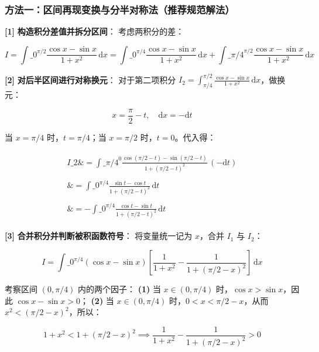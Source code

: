 \documentclass[11pt,a4paper,UTF8]{ctexart}
\begin{document}
\subsubsection{方法一：区间再现变换与分半对称法（推荐规范解法）}
\begin{solbox}[分步推导与答题规范]
\textbf{[1]}  \textbf{构造积分差值并拆分区间}：
考虑两积分的差：

\begin{equation*}
I = \int\_0^{\pi/2} \frac{\cos x - \sin x}{1+x^2}\,\mathrm{d}x = \int\_0^{\pi/4} \frac{\cos x - \sin x}{1+x^2}\,\mathrm{d}x + \int\_{\pi/4}^{\pi/2} \frac{\cos x - \sin x}{1+x^2}\,\mathrm{d}x
\end{equation*}


\textbf{[2]}  \textbf{对后半区间进行对称换元}：
对于第二项积分 $I_2 = \int_{\pi/4}^{\pi/2} \frac{\cos x - \sin x}{1+x^2}\,\mathrm{d}x$，做换元：

\begin{equation*}
x = \frac{\pi}{2} - t,\quad \mathrm{d}x = -\mathrm{d}t
\end{equation*}

当 $x = \pi/4$ 时，$t = \pi/4$；当 $x = \pi/2$ 时，$t = 0$。代入得：

\begin{align*}
\begin{aligned}
I\_2 \&= \int\_{\pi/4}^0 \frac{\cos(\pi/2 - t) - \sin(\pi/2 - t)}{1+(\pi/2 - t)^2}\,(-\mathrm{d}t) \\ \\
\&= \int\_0^{\pi/4} \frac{\sin t - \cos t}{1+(\pi/2 - t)^2}\,\mathrm{d}t \\ \\
\&= -\int\_0^{\pi/4} \frac{\cos t - \sin t}{1+(\pi/2 - t)^2}\,\mathrm{d}t
\end{aligned}
\end{align*}


\textbf{[3]}  \textbf{合并积分并判断被积函数符号}：
将变量统一记为 $x$，合并 $I_1$ 与 $I_2$：

\begin{equation*}
I = \int\_0^{\pi/4} (\cos x - \sin x) \left[ \frac{1}{1+x^2} - \frac{1}{1+(\pi/2 - x)^2} \right]\,\mathrm{d}x
\end{equation*}

考察区间 $(0, \pi/4)$ 内的两个因子：
\textbf{(1)}  当 $x \in (0, \pi/4)$ 时，$\cos x > \sin x$，因此 $\cos x - \sin x > 0$；
\textbf{(2)}  当 $x \in (0, \pi/4)$ 时，$0 < x < \pi/2 - x$，从而 $x^2 < (\pi/2 - x)^2$，所以：

\begin{equation*}
1 + x^2 < 1 + (\pi/2 - x)^2 \implies \frac{1}{1+x^2} - \frac{1}{1+(\pi/2 - x)^2} > 0
\end{equation*}


\end{solbox}
\end{document}
